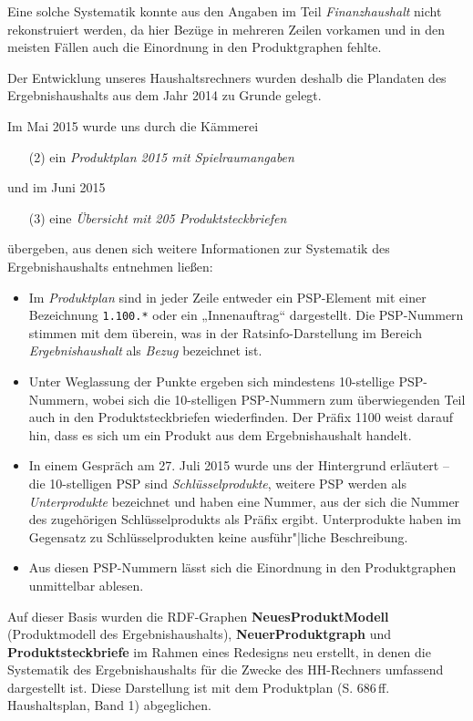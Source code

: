 \documentclass[a4paper,11pt,twoside]{article}
\begin{document}
Eine solche Systematik konnte aus den Angaben im Teil \emph{Finanzhaushalt}
nicht rekonstruiert werden, da hier Bezüge in mehreren Zeilen vorkamen und in
den meisten Fällen auch die Einordnung in den Produktgraphen fehlte.

Der Entwicklung unseres Haushaltsrechners wurden deshalb die Plandaten des
Ergebnishaushalts aus dem Jahr 2014 zu Grunde gelegt.

Im Mai 2015 wurde uns durch die Kämmerei
\begin{itemize}
\item [(2)] ein \emph{Produktplan 2015 mit Spielraumangaben} 
\end{itemize}
und im Juni 2015 
\begin{itemize}
\item [(3)] eine \emph{Übersicht mit 205 Produktsteckbriefen} 
\end{itemize}
übergeben, aus denen sich weitere Informationen zur Systematik des
Ergebnishaushalts entnehmen ließen: 
\begin{itemize}
\item Im \emph{Produktplan} sind in jeder Zeile entweder ein PSP-Element mit
  einer Bezeichnung \texttt{1.100.*} oder ein „Innenauftrag“ dargestellt. Die
  PSP-Nummern stimmen mit dem überein, was in der Ratsinfo-Darstellung im
  Bereich \emph{Ergebnishaushalt} als \emph{Bezug} bezeichnet ist.
\item Unter Weglassung der Punkte ergeben sich mindestens 10-stellige
  PSP-Nummern, wobei sich die 10-stelligen PSP-Nummern zum überwiegenden Teil
  auch in den Produktsteckbriefen wiederfinden.  Der Präfix 1100 weist darauf
  hin, dass es sich um ein Produkt aus dem Ergebnishaushalt handelt. 
\item In einem Gespräch am 27. Juli 2015 wurde uns der Hintergrund erläutert --
  die 10-stelligen PSP sind \emph{Schlüsselprodukte}, weitere PSP werden als
  \emph{Unterprodukte} bezeichnet und haben eine Nummer, aus der sich die
  Nummer des zugehörigen Schlüsselprodukts als Präfix ergibt. Unterprodukte
  haben im Gegensatz zu Schlüsselprodukten keine ausführ"|liche Beschreibung. 
\item Aus diesen PSP-Nummern lässt sich die Einordnung in den Produktgraphen
  unmittelbar ablesen. 
\end{itemize}
Auf dieser Basis wurden die RDF-Graphen \textbf{NeuesProduktModell}
(Produktmodell des Ergebnishaushalts), \textbf{NeuerProduktgraph} und
\textbf{Produktsteckbriefe} im Rahmen eines Redesigns neu erstellt, in denen
die Systematik des Ergebnishaushalts für die Zwecke des HH-Rechners umfassend
dargestellt ist.  Diese Darstellung ist mit dem Produktplan
(S. 686\,ff. Haushaltsplan, Band 1) abgeglichen.
\end{document}
